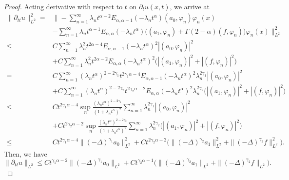 \documentclass[11pt]{article}
\numberwithin{equation}{section}
\begin{document}
\begin{proof}
Acting derivative with respect to $t$ on $\partial_t u(x,t)$, we arrive at
\begin{align*} 
\|\partial_{tt}u\|_{L^2}^2 =&\bigg\|-\sum_{n=1}^{\infty}\lambda_nt^{\alpha-2}E_{\alpha,\alpha-1}(-\lambda_nt^\alpha)(a_0,\varphi_n)\varphi_n(x)\\ &-\sum_{n=1}^{\infty}\lambda_nt^{\alpha-1} E_{\alpha,\alpha}(-\lambda_n t^\alpha)\Big((a_1, \varphi_n)+\Gamma(2-\alpha)(f, \varphi_n)\Big)  \varphi_n(x)\bigg\|_{L^2}^2\\ \le&C\sum_{n=1}^{\infty}\lambda_n^2t^{2\alpha-4}E_{\alpha,\alpha-1}(-\lambda_nt^\alpha)^2|(a_0,\varphi_n)|^2\\ &+C\sum_{n=1}^{\infty}\lambda_n^2t^{2\alpha-2}E_{\alpha,\alpha}(-\lambda_nt^\alpha)^2\Big(|(a_1, \varphi_n)|^2+|(f, \varphi_n)|^2\Big)\\
=&C\sum_{n=1}^{\infty}(\lambda_nt^\alpha)^{2-2\gamma_1}t^{2\gamma_1\alpha-4}E_{\alpha,\alpha-1}(-\lambda_nt^\alpha)^2\lambda_n^{2\gamma_1}|(a_0,\varphi_n)|^2\\ &+C\sum_{n=1}^{\infty}(\lambda_nt^\alpha)^{2-2\gamma_2}t^{2\gamma_2\alpha-2}E_{\alpha,\alpha}(-\lambda_n t^\alpha)^2\lambda_n^{2\gamma_2}\Big(|(a_1, \varphi_n)|^2+|(f, \varphi_n)|^2\Big)\\ \le&Ct^{2\gamma_1\alpha-4}\sup_n\frac{(\lambda_nt^\alpha)^{2-2\gamma_1}}{(1+\lambda_nt^\alpha)^2}\sum_{n=1}^{\infty}\lambda_n^{2\gamma_1}|(a_0,\varphi_n)|^2\\ &+Ct^{2\gamma_2\alpha-2}\sup_n\frac{(\lambda_nt^\alpha)^{2-2\gamma_2}}{(1+\lambda_nt^\alpha)^2}\sum_{n=1}^{\infty}\lambda_n^{2\gamma_2}\Big(|(a_1, \varphi_n)|^2+|(f, \varphi_n)|^2\Big)\\ \le&Ct^{2\gamma_1\alpha-4}\|(-\Delta)^{\gamma_1}a_0\|_{L^2}^2 +Ct^{2\gamma_2\alpha-2}\Big(\|(-\Delta)^{\gamma_2}a_1\|_{L^2}^2+\|(-\Delta)^{\gamma_2}f\|_{L^2}^2\Big). \end{align*} Then, we have \[ \|\partial_{tt}u\|_{L^2} \leq Ct^{\gamma_1\alpha-2}\|(-\Delta)^{\gamma_1}a_0\|_{L^2} +Ct^{\gamma_2\alpha-1}\Big(\|(-\Delta)^{\gamma_2}a_1\|_{L^2}+\|(-\Delta)^{\gamma_2}f\|_{L^2}\Big). \]


\end{proof}
\end{document}
